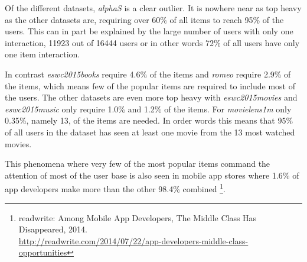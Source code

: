 Of the different datasets, \textit{alphaS} is a clear outlier. It is nowhere near as top heavy as the other datasets are, requiring over 60\% of all items to reach 95\% of the users. This can in part be explained by the large number of users with only one interaction, 11923 out of 16444 users or in other words 72\% of all users have only one item interaction.

In contrast \textit{eswc2015books} require 4.6\% of the items and \textit{romeo} require 2.9\% of the items, which means few of the popular items are required to include most of the users. The other datasets are even more top heavy with \textit{eswc2015movies} and \textit{eswc2015music} only require 1.0\% and 1.2\% of the items. For \textit{movielens1m} only 0.35\%, namely 13, of the items are needed. In order words this means that 95\% of all users in the dataset has seen at least one movie from the 13 most watched movies.

This phenomena where very few of the most popular items command the attention of most of the user base is also seen in mobile app stores where 1.6\% of app developers make more than the other 98.4\% combined
\footnote{
readwrite: Among Mobile App Developers, The Middle Class Has Disappeared, 2014. \\
\url{http://readwrite.com/2014/07/22/app-developers-middle-class-opportunities}
}.

\FloatBarrier
